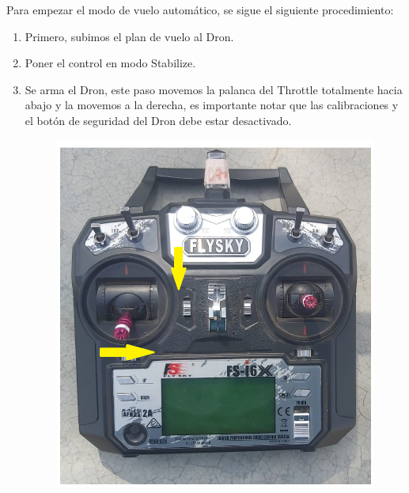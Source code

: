 Para empezar el modo de vuelo automático, se sigue el siguiente procedimiento:
\begin{enumerate}
	\item Primero, subimos el plan de vuelo al Dron.
	\item Poner el control en modo Stabilize.
	\item Se arma el Dron, este paso movemos la palanca del Throttle totalmente hacia abajo y la movemos a la derecha, es importante notar que las calibraciones y el botón de seguridad del Dron debe estar desactivado.
	
	\begin{figure}[H]
		\centering
		\begin{minipage}[b]{0.4\textwidth}
			\centering
			\includegraphics[width=\textwidth]{imagenes/ctr5}
		\end{minipage}
		\hspace{0.05\textwidth} %
		\begin{minipage}[b]{0.5\textwidth}
			\centering

\end{minipage}
\end{figure}
\end{enumerate}
